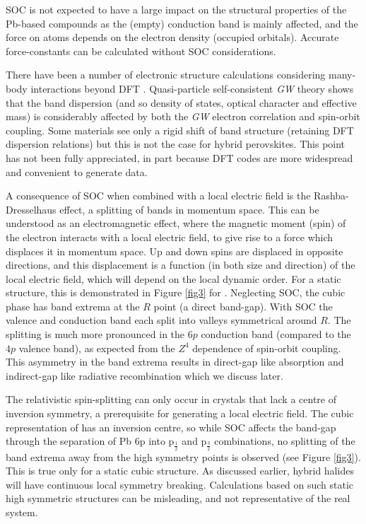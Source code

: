 SOC is not expected to have a large impact on the structural properties of the Pb-based compounds as the (empty) conduction band is mainly affected, and the force on atoms depends on the electron density (occupied orbitals). 
Accurate force-constants can be calculated without SOC considerations.\autocite{PerezOsorio2015a}

There have been a number of electronic structure calculations considering many-body interactions beyond DFT . 
Quasi-particle self-consistent \textit{GW} theory shows that the band dispersion (and so density of states, optical character and effective mass) is considerably affected by both the \textit{GW} electron correlation and spin-orbit coupling.\autocite{Brivio2014a}
Some materials see only a rigid shift of band structure (retaining DFT dispersion relations)\autocite{VanSchilfgaarde2006,Butler2016} but this is not the case for hybrid perovskites.
This point has not been fully appreciated, in part because DFT codes are more widespread and convenient to generate data.

A consequence of SOC when combined with a local electric field is the Rashba-Dresselhaus effect, a splitting of bands in momentum space.\autocite{Kepenekian2015} 
This can be understood as an electromagnetic effect, where the magnetic moment (spin) of the electron interacts with a local electric field, to give rise to a force which displaces it in momentum space. 
Up and down spins are displaced in opposite directions, and this displacement is a function (in both size and direction) of the local electric field, which will depend on the local dynamic order. 
For a static structure, this is demonstrated in Figure \ref{fig3} for . 
Neglecting SOC, the cubic phase has band extrema at the $R$ point (a direct band-gap).
With SOC the valence and conduction band each split into valleys symmetrical around $R$.
The splitting is much more pronounced in the  $6p$ conduction band (compared to the  $4p$ valence band), as expected from the $Z^4$ dependence of spin-orbit coupling.
This asymmetry in the band extrema results in direct-gap like absorption and indirect-gap like radiative recombination which we discuss later.

The relativistic spin-splitting can only occur in crystals that lack a centre of inversion symmetry, a prerequisite for generating a local electric field. 
The cubic representation of  has an inversion centre, so while SOC affects the band-gap through the separation of Pb 6p into p$_{\frac{1}{2}}$ and  p$_{\frac{3}{2}}$ combinations,
no splitting of the band extrema away from the high symmetry points is observed (see Figure \ref{fig3}).
This is true only for a static cubic structure. 
As discussed earlier, hybrid halides will have continuous local symmetry breaking. 
Calculations based on such static high symmetric structures can be misleading, and not representative
of the real system. 


